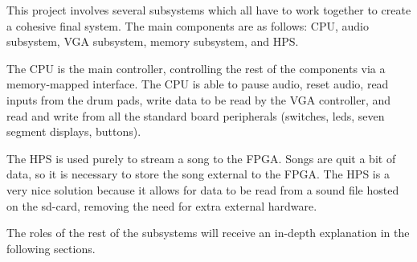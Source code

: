 \documentclass{subfile}
\begin{document}
  This project involves several subsystems which all have to work together to create a 
  cohesive final system. 
  The main components are as follows: CPU, audio subsystem, VGA subsystem, memory subsystem, 
  and HPS.

  The CPU is the main controller, controlling the rest of the components via a memory-mapped interface. 
  The CPU is able to pause audio, reset audio, read inputs from the drum pads, write data to be read 
  by the VGA controller, and read and write from all the standard board peripherals (switches, leds, seven 
  segment displays, buttons).

  The HPS is used purely to stream a song to the FPGA. 
  Songs are quit a bit of data, so it is necessary to store the song external to the FPGA. 
  The HPS is a very nice solution because it allows for data to be read from a sound file hosted 
  on the sd-card, removing the need for extra external hardware.

  The roles of the rest of the subsystems will receive an in-depth explanation in the following sections.
\end{document}

